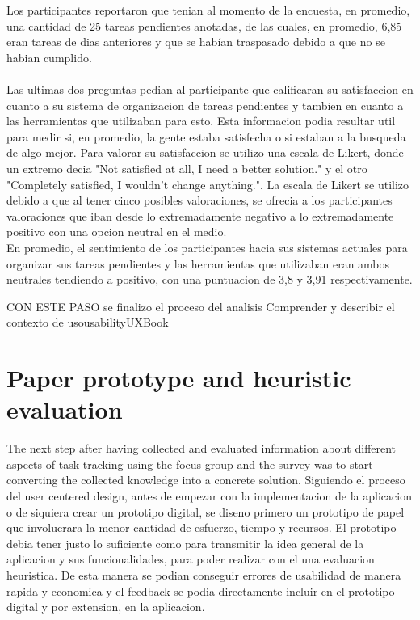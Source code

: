 Los participantes reportaron que tenian al momento de la encuesta, en promedio, una cantidad de 25 tareas pendientes anotadas, de las cuales, en promedio, 6,85 eran tareas de dias anteriores y que se habían traspasado debido a que no se habian cumplido.\\ 
\\
Las ultimas dos preguntas pedian al participante que calificaran su satisfaccion en cuanto a su sistema de organizacion de tareas pendientes y tambien en cuanto a las herramientas que utilizaban para esto. Esta informacion podia resultar util para medir si, en promedio, la gente estaba satisfecha o si estaban a la busqueda de algo mejor. Para valorar su satisfaccion se utilizo una escala de Likert, donde un extremo decia "Not satisfied at all, I need a better solution." y el otro "Completely satisfied, I wouldn't change anything.". La escala de Likert se utilizo debido a que al tener cinco posibles valoraciones, se ofrecia a los participantes valoraciones que iban desde lo extremadamente negativo a lo extremadamente positivo con una opcion neutral en el medio.\\
En promedio, el sentimiento de los participantes hacia sus sistemas actuales para organizar sus tareas pendientes y las herramientas que utilizaban eran ambos neutrales tendiendo a positivo, con una puntuacion de 3,8 y 3,91 respectivamente.


CON ESTE PASO se finalizo el proceso del analisis Comprender y describir el contexto de usousabilityUXBook 

\section{Paper prototype and heuristic evaluation}

The next step after having collected and evaluated information about different aspects of task tracking using the focus group and the survey was to start converting the collected knowledge into a concrete solution. Siguiendo el proceso del user centered design, antes de empezar con la implementacion de la aplicacion o de siquiera crear un prototipo digital, se diseno primero un prototipo de papel que involucrara la menor cantidad de esfuerzo, tiempo y recursos. El prototipo debia tener justo lo suficiente como para transmitir la idea general de la aplicacion y sus funcionalidades, para poder realizar con el una evaluacion heuristica. De esta manera se podian conseguir errores de usabilidad de manera rapida y economica y el feedback se podia directamente incluir en el prototipo digital y por extension, en la aplicacion.\\ 

